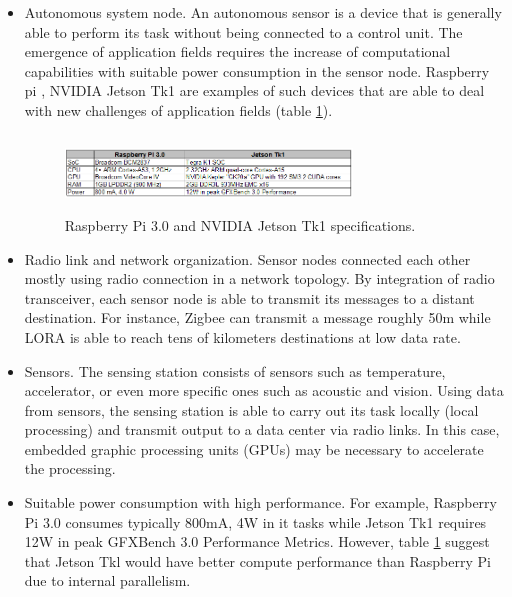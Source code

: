 \documentclass[10pt,a4paper]{article}
\begin{document}
\begin{itemize}
\item Autonomous system node. An autonomous sensor \cite{Auto5475165} is a device that is generally able to perform its task without being connected to a control  unit. The emergence of application fields requires the increase of computational capabilities with suitable power consumption in the sensor node. Raspberry pi \cite{PI3}, NVIDIA Jetson Tk1 \cite{Jetson} are examples of such devices that are able to deal with new challenges of application fields (table \ref{img:PiJetson}). 

\begin{figure}[ht]
\centering
\includegraphics[width=3.0in,height=0.8in]{img/PiJetson.png}
\caption{Raspberry Pi 3.0 and NVIDIA Jetson Tk1 specifications.}
\label{img:PiJetson}
\end{figure}

\item Radio link and network organization. Sensor nodes connected each other mostly using radio connection in a network topology. By integration of radio transceiver, each sensor node is able to transmit its messages to a distant destination. For instance, Zigbee \cite{Zigbee} can transmit a message roughly 50m while LORA \cite{LORA} is able to reach tens of kilometers destinations at low data rate.

\item Sensors. The sensing station consists of sensors such as temperature, accelerator, or even more specific ones such as acoustic and vision. Using data from sensors, the sensing station is able to carry out its task locally (local processing) and transmit output to a data center via radio links. In this case, embedded graphic processing units (GPUs) may be necessary to accelerate the processing.
 
\item Suitable power consumption with high performance. For example, Raspberry Pi 3.0 consumes typically 800mA, 4W in it tasks while Jetson Tk1 requires 12W in peak GFXBench 3.0 Performance Metrics. However, table \ref{img:PiJetson} suggest that Jetson Tkl 
would have better compute performance than Raspberry Pi due to internal parallelism.
\end{itemize}
\end{document}
